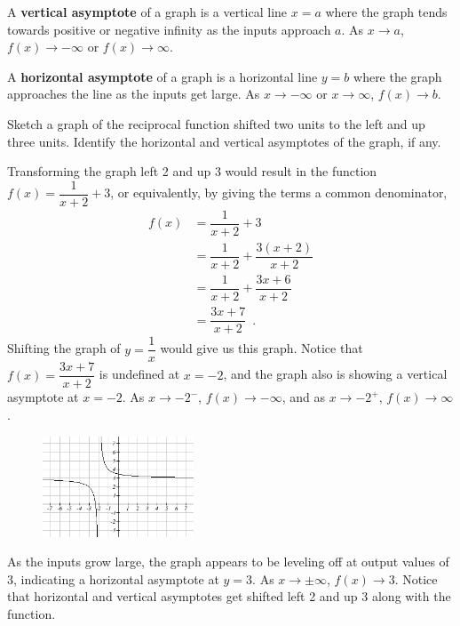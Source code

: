 \begin{definition}
A {\bf vertical asymptote} of a graph is a vertical line $x=a$ where the graph tends towards positive or negative infinity as the inputs approach $a$. As $x\to a$, $f(x)\to -\infty$ or $f(x) \to \infty$.

A {\bf horizontal asymptote} of a graph is a horizontal line $y=b$ where the graph approaches the line as the inputs get large. As $x\to -\infty$ or $x\to\infty$, $f(x)\to b$.
\end{definition}
\begin{example}
Sketch a graph of the reciprocal function shifted two units to the left and up three units. Identify the horizontal and vertical asymptotes of the graph, if any.

\begin{solution} Transforming the graph left 2 and up 3 would result in the function $f(x)=\dfrac{1}{x+2}+3$, or equivalently, by giving the terms a common denominator,
\begin{align*}
f(x) &= \dfrac{1}{x+2}+3 \\
	   &= \dfrac{1}{x+2} + \dfrac{3(x+2)}{x+2}\\
		 &= \dfrac{1}{x+2} + \dfrac{3x+6}{x+2}\\
	   &= \dfrac{3x+7}{x+2} \enspace.
	 \end{align*}
Shifting the graph of $y = \dfrac{1}{x}$ would give us this graph. Notice that $f(x) = \dfrac{3x+7}{x+2}$ is undefined at $x=-2$, and the graph also is showing a vertical asymptote at $x=-2$. As $x\to-2^-$, $f(x)\to-\infty$, and as $x\to-2^+$, $f(x)\to\infty$.

\begin{figure}[!ht]
\centering
\includegraphics[width=0.4\textwidth]{img/chap1/sec1-5/image071.png}
\caption{}
\end{figure}
As the inputs grow large, the graph appears to be leveling off at output values of 3, indicating a horizontal asymptote at $y=3$. As $x\to\pm\infty$, $f(x)\to 3$. Notice that horizontal and vertical asymptotes get shifted left 2 and up 3 along with the function.
\end{solution}\end{example}

